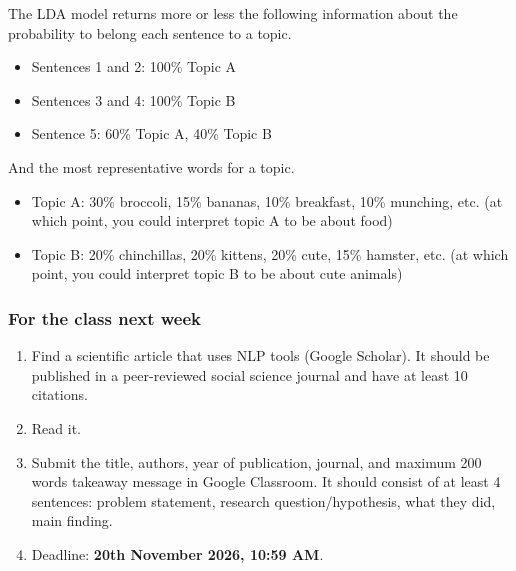 \documentclass[aspectratio=169]{beamer}
\begin{document}
\begin{frame}
{        The LDA model returns more or less the following information about the probability to belong each sentence to a topic.
        
        \begin{itemize}
            \item Sentences 1 and 2: 100\% Topic A
            \item Sentences 3 and 4: 100\% Topic B
            \item Sentence 5: 60\% Topic A, 40\% Topic B
        \end{itemize}

        And the most representative words for a topic.
        
        \begin{itemize}
            \item Topic A: 30\% broccoli, 15\% bananas, 10\% breakfast, 10\% munching, etc. (at which point, you could interpret topic A to be about food)
            \item Topic B: 20\% chinchillas, 20\% kittens, 20\% cute, 15\% hamster, etc. (at which point, you could interpret topic B to be about cute animals)
        \end{itemize}

    }
\end{frame}


\begin{frame}
    \frametitle{For the class next week}
    \begin{enumerate}
        \item Find a scientific article that uses NLP tools (Google Scholar). It should be published in a peer-reviewed social science journal and have at least 10 citations.
        \item Read it.
        \item Submit the title, authors, year of publication, journal, and maximum 200 words takeaway message in Google Classroom. It should consist of at least 4 sentences: problem statement, research question/hypothesis, what they did, main finding.
        \item Deadline: \textbf{20th November 2026, 10:59 AM}.
    \end{enumerate}
\end{frame}
\end{document}
